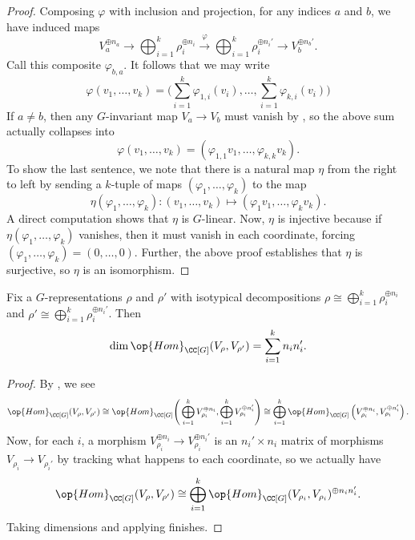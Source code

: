 \documentclass[../main.tex]{subfiles}
\begin{document}
\begin{proof}
	Composing $\varphi$ with inclusion and projection, for any indices $a$ and $b$, we have induced maps
	\[V_a^{\oplus n_a}\to\bigoplus_{i=1}^k\rho_i^{\oplus n_i}\stackrel\varphi\to\bigoplus_{i=1}^k\rho_i^{\oplus n_i'}\to V_b^{\oplus n_b'}.\]
	Call this composite $\varphi_{b,a}$. It follows that we may write
	\[\varphi(v_1,\ldots,v_k)=\Bigg(\sum_{i=1}^k\varphi_{1,i}(v_i),\ldots,\sum_{i=1}^k\varphi_{k,i}(v_i)\Bigg)\]
	If $a\ne b$, then any $G$-invariant map $V_a\to V_b$ must vanish by , so the above sum actually collapses into
	\[\varphi(v_1,\ldots,v_k)=(\varphi_{1,1}v_1,\ldots,\varphi_{k,k}v_k).\]
	To show the last sentence, we note that there is a natural map $\eta$ from the right to left by sending a $k$-tuple of maps $(\varphi_1,\ldots,\varphi_k)$ to the map
	\[\eta(\varphi_1,\ldots,\varphi_k)\colon(v_1,\ldots,v_k)\mapsto(\varphi_1v_1,\ldots,\varphi_kv_k).\]
	A direct computation shows that $\eta$ is $G$-linear. Now, $\eta$ is injective because if $\eta(\varphi_1,\ldots,\varphi_k)$ vanishes, then it must vanish in each coordinate, forcing $(\varphi_1,\ldots,\varphi_k)=(0,\ldots,0)$. Further, the above proof establishes that $\eta$ is surjective, so $\eta$ is an isomorphism.
\end{proof}
\begin{corollary} \label{cor:bilin-hom-form}
	Fix a $G$-representations $\rho$ and $\rho'$ with isotypical decompositions $\rho\cong\bigoplus_{i=1}^k\rho_i^{\oplus n_i}$ and $\rho'\cong\bigoplus_{i=1}^k\rho_i^{\oplus n_i'}$. Then
	\[\dim\op{Hom}_{\CC[G]}(V_\rho,V_{\rho'})=\sum_{i=1}^kn_in_i'.\]
\end{corollary}
\begin{proof}
	By , we see
	\[\op{Hom}_{\CC[G]}(V_\rho,V_{\rho'})\cong\op{Hom}_{\CC[G]}\Bigg(\bigoplus_{i=1}^kV_{\rho_i}^{\oplus n_i},\bigoplus_{i=1}^kV_{\rho_i}^{\oplus n_i'}\Bigg)\cong\bigoplus_{i=1}^k\op{Hom}_{\CC[G]}\left(V_{\rho_i}^{\oplus n_i},V_{\rho_i}^{\oplus n_i'}\right).\]
	Now, for each $i$, a morphism $V_{\rho_i}^{\oplus n_i}\to V_{\rho_i}^{\oplus n_i'}$ is an $n_i'\times n_i$ matrix of morphisms $V_{\rho_i}\to V_{\rho_i'}$ by tracking what happens to each coordinate, so we actually have
	\[\op{Hom}_{\CC[G]}(V_\rho,V_{\rho'})\cong\bigoplus_{i=1}^k\op{Hom}_{\CC[G]}(V_{\rho_i},V_{\rho_i})^{\oplus n_in_i'}.\]
	Taking dimensions and applying  finishes.
\end{proof}
\end{document}
